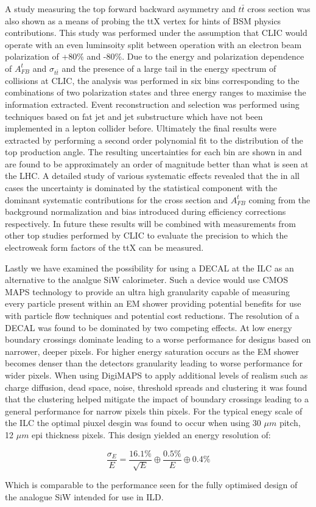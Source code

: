 A study measuring the top forward backward asymmetry and $t\bar{t}$ cross section was also shown as a means of probing the ttX vertex for hints of \ac{BSM} physics contributions. This study was performed under the assumption that \ac{CLIC} would operate with an even luminsoity split between operation with an electron beam polarization of +80\% and -80\%. Due to the energy and polarization dependence of $A_{FB}^t$ and $\sigma_{t\bar{t}}$ and the presence of a large tail in the energy spectrum of collisions at \ac{CLIC}, the analysis was performed in six bins corresponding to the combinations of two polarization states and three energy ranges to maximise the information extracted. Event reconstruction and selection was performed using techniques based on fat jet and jet substructure which have not been implemented in a lepton collider before. Ultimately the final results were extracted by performing a second order polynomial fit to the distribution of the top production angle. The resulting uncertainties for each bin are shown in  and are found to be approximately an order of magnitude better than what is seen at the \ac{LHC}\cite{Bai:2011uk}. A detailed study of various systematic effects revealed that the in all cases the uncertainty is dominated by the statistical component with the dominant systematic contributions for the cross section and $A_{FB}^t$ coming from the background normalization and bias introduced during efficiency corrections respectively. In future these results will be combined with measurements from other top studies performed by \ac{CLIC} to evaluate the precision to which the electroweak form factors of the ttX can be measured.

Lastly we have examined the possibility for using a \ac{DECAL} at the \ac{ILC} as an alternative to the analgue SiW calorimeter. Such a device would use \ac{CMOS} \ac{MAPS} technology to provide an ultra high granularity capable of measuring every particle present within an \ac{EM} shower providing potential benefits for use with particle flow techniques and potential cost reductions. The resolution of a \ac{DECAL} was found to be dominated by two competing effects. At low energy boundary crossings dominate leading to a worse performance for designs based on narrower, deeper pixels. For higher energy saturation occurs as the EM shower becomes denser than the detectors granularity leading to worse performance for wider pixels. When using DigiMAPS to apply additional levels of realism such as charge diffusion, dead space, noise, threshold spreads and clustering it was found that the clustering helped mitigate the impact of boundary crossings leading to a general performance for narrow pixels thin pixels. For the typical enegy scale of the \ac{ILC} the optimal piuxel desgin was found to occur when using 30 $\mu m$ pitch, 12 $\mu m$ epi thickness pixels. This design yielded an energy resolution of:

\begin{equation}
  \frac{\sigma_E}{E}=\frac{16.1\%}{\sqrt{E}} \oplus \frac{0.5\%}{E} \oplus 0.4\%
\end{equation}

Which is comparable to the performance seen for the fully optimised design of the analogue SiW intended for use in \ac{ILD}. 

